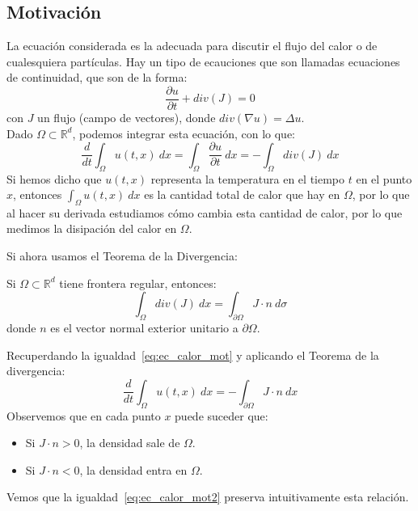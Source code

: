 \subsection{Motivación}
\noindent
La ecuación considerada es la adecuada para discutir el flujo del calor o de cualesquiera partículas. Hay un tipo de ecauciones que son llamadas ecuaciones de continuidad, que son de la forma:
\begin{equation}\label{eq:continuidad}
    \frac{\partial u}{\partial t} + div(J) = 0 
\end{equation}
con $J$ un flujo (campo de vectores), donde $div(\nabla u) = \Delta u$.\\

\noindent
Dado $\Omega\subset\mathbb{R}^d$, podemos integrar esta ecuación, con lo que:
\begin{equation}\label{eq:ec_calor_mot}
    \frac{d}{dt}\int_\Omega u(t,x)~dx = \int_\Omega \frac{\partial u}{\partial t}~dx = -\int_\Omega div(J)~dx
\end{equation}
Si hemos dicho que $u(t,x)$ representa la temperatura en el tiempo $t$ en el punto $x$, entonces $\int_\Omega u(t,x)~dx$ es la cantidad total de calor que hay en $\Omega$, por lo que al hacer su derivada estudiamos cómo cambia esta cantidad de calor, por lo que medimos la disipación del calor en $\Omega$.

Si ahora usamos el Teorema de la Divergencia:
\begin{teo}[de la Divergencia]
    Si $\Omega\subset\mathbb{R}^d$ tiene frontera regular, entonces:
    \begin{equation*}
        \int_\Omega div(J)~dx = \int_{\partial \Omega}J\cdot n~d\sigma
    \end{equation*}
    donde $n$ es el vector normal exterior unitario a $\partial \Omega$.
\end{teo}

\noindent
Recuperdando la igualdad~\eqref{eq:ec_calor_mot} y aplicando el Teorema de la divergencia:
\begin{equation}\label{eq:ec_calor_mot2}
    \dfrac{d}{dt}\int_\Omega u(t,x)~dx = -\int_{\partial \Omega}J\cdot n~dx
\end{equation}
Observemos que en cada punto $x$ puede suceder que:
\begin{itemize}
    \item Si $J\cdot n>0$, la densidad sale de $\Omega$.
    \item Si $J\cdot n<0$, la densidad entra en $\Omega$.
\end{itemize}
Vemos que la igualdad~\eqref{eq:ec_calor_mot2} preserva intuitivamente esta relación.\\

